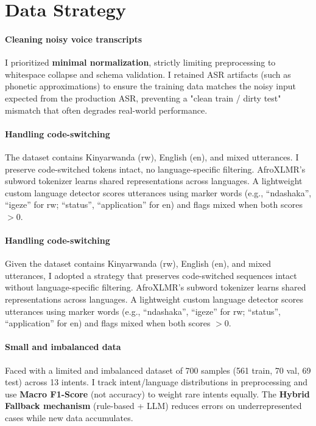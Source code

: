 \documentclass[11pt]{article}
\begin{document}
\section*{Data Strategy}

\paragraph{Cleaning noisy voice transcripts}
I prioritized \textbf{minimal normalization}, strictly limiting preprocessing to whitespace collapse and schema validation. I retained ASR artifacts (such as phonetic approximations) to ensure the training data matches the noisy input expected from the production ASR, preventing a "clean train / dirty test" mismatch that often degrades real-world performance.

\paragraph{Handling code-switching}
The dataset contains Kinyarwanda (rw), English (en), and mixed utterances. I preserve code-switched tokens intact, no language-specific filtering. AfroXLMR's subword tokenizer learns shared representations across languages. A lightweight custom language detector scores utterances using marker words (e.g., ``ndashaka'', ``igeze'' for rw; ``status'', ``application'' for en) and flags mixed when both scores $>$0.

\paragraph{Handling code-switching}
Given the dataset contains Kinyarwanda (rw), English (en), and mixed utterances, I adopted a strategy that preserves code-switched sequences intact without language-specific filtering. AfroXLMR's subword tokenizer learns shared representations across languages. A lightweight custom language detector scores utterances using marker words (e.g., ``ndashaka'', ``igeze'' for rw; ``status'', ``application'' for en) and flags mixed when both scores $>$0.

\paragraph{Small and imbalanced data}
Faced with a limited and imbalanced dataset of 700 samples (561 train, 70 val, 69 test) across 13 intents. I track intent/language distributions in preprocessing and use \textbf{Macro F1-Score} (not accuracy) to weight rare intents equally. The \textbf{Hybrid Fallback mechanism} (rule-based + LLM) reduces errors on underrepresented cases while new data accumulates.
\end{document}
